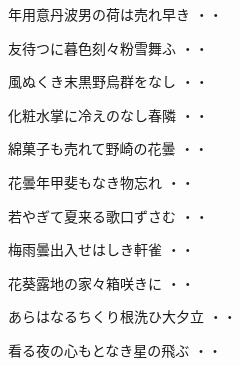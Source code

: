 \vspace{0.6cm}
\begin{shiika}年用意丹波男の荷は売れ早き
\hfill{・・}\end{shiika}
\vspace{0.6cm}
\begin{shiika}友待つに暮色刻々粉雪舞ふ
\hfill{・・}\end{shiika}
\vspace{0.6cm}
\begin{shiika}風ぬくき末黒野烏群をなし
\hfill{・・}\end{shiika}
\vspace{0.6cm}
\begin{shiika}化粧水掌に冷えのなし春隣
\hfill{・・}\end{shiika}
\vspace{0.6cm}
\begin{shiika}綿菓子も売れて野崎の花曇
\hfill{・・}\end{shiika}
\vspace{0.6cm}
\begin{shiika}花曇年甲斐もなき物忘れ
\hfill{・・}\end{shiika}
\vspace{0.6cm}
\begin{shiika}若やぎて夏来る歌口ずさむ
\hfill{・・}\end{shiika}
\vspace{0.6cm}
\begin{shiika}梅雨曇出入せはしき軒雀
\hfill{・・}\end{shiika}
\vspace{0.6cm}
\begin{shiika}花葵露地の家々箱咲きに
\hfill{・・}\end{shiika}
\vspace{0.6cm}
\begin{shiika}あらはなるちくり根洗ひ大夕立
\hfill{・・}\end{shiika}
\vspace{0.6cm}
\begin{shiika}看る夜の心もとなき星の飛ぶ
\hfill{・・}\end{shiika}
\vspace{0.6cm}
